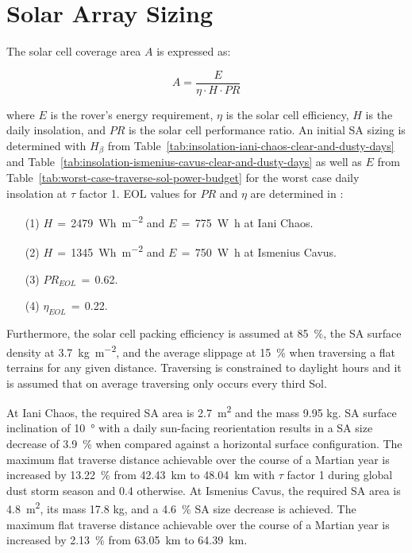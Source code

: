 \documentclass[twocolumn,letterpaper]{IEEEAerospaceCLS}  %
\newcommand{\refTab}[1]{{Table}~\ref{#1}}  %
\begin{document}
\section{Solar Array Sizing}

The solar cell coverage area $A$ is expressed as:

\begin{equation}
  \label{eq:solar_cell_coverage_area}
  A = \frac{E}{\eta \cdot H \cdot PR}
\end{equation}

where $E$ is the rover's energy requirement, $\eta$ is the solar cell efficiency, $H$ is the daily insolation, and $PR$ is the solar cell performance ratio. An initial \ac{SA} sizing is determined with $H_{\beta}$ from \refTab{tab:insolation-iani-chaos-clear-and-dusty-days} and \refTab{tab:insolation-ismenius-cavus-clear-and-dusty-days} as well as $E$ from \refTab{tab:worst-case-traverse-sol-power-budget} for the worst case daily insolation at $\tau$ factor 1. \ac{EOL} values for $PR$ and $\eta$ are determined in \cite{Labreche2020}:

\begin{itemize}
  \item [(1)] $H$\,$=$\,\SI{2479}{Wh.m^{-2}} and $E$\,$=$\,\SI{775}{\watt\hour} at Iani Chaos.
  \item [(2)] $H$\,$=$\,\SI{1345}{Wh.m^{-2}} and $E$\,$=$\,\SI{750}{\watt\hour} at Ismenius Cavus.
  \item [(3)] $PR_{EOL}$\,$=$\,0.62.
  \item [(4)] $\eta_{EOL}$\,$=$\,0.22.
\end{itemize}

Furthermore, the solar cell packing efficiency is assumed at \SI{85}{\percent}, the \ac{SA} surface density at \SI{3.7}{kg.m^{-2}}, and the average slippage at \SI{15}{\percent} when traversing a flat terrains for any given distance. Traversing is constrained to daylight hours and it is assumed that on average traversing only occurs every third Sol.

At Iani Chaos, the required \ac{SA} area is \SI{2.7}{m^{2}} and the mass 9.95 \si{\kilo\gram}. \ac{SA} surface inclination of \SI{10}{\degree} with a daily sun-facing reorientation results in a \ac{SA} size decrease of \SI{3.9}{\percent} when compared against a horizontal surface configuration. The maximum flat traverse distance achievable over the course of a Martian year is increased by \SI{13.22}{\percent} from \SI{42.43}{\kilo\meter} to \SI{48.04}{\kilo\meter} with $\tau$ factor 1 during global dust storm season and 0.4 otherwise. At Ismenius Cavus, the required \ac{SA} area is \SI{4.8}{m^{2}}, its mass 17.8 \si{\kilo\gram}, and a \SI{4.6}{\percent} \ac{SA} size decrease is achieved. The maximum flat traverse distance achievable over the course of a Martian year is increased by \SI{2.13}{\percent} from \SI{63.05}{\kilo\meter} to \SI{64.39}{\kilo\meter}.
\end{document}
